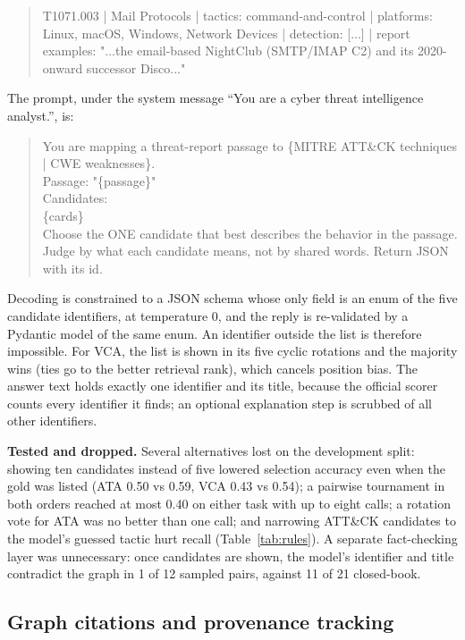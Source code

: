\documentclass[conference]{IEEEtran}
\begin{document}
\begin{quote}\footnotesize\ttfamily
T1071.003 | Mail Protocols | tactics: command-and-control | platforms: Linux, macOS, Windows, Network Devices | detection: [...] | report examples: "...the email-based NightClub (SMTP/IMAP C2) and its 2020-onward successor Disco..."
\end{quote}

The prompt, under the system message ``You are a cyber threat intelligence analyst.'', is:

\begin{quote}\footnotesize\ttfamily
You are mapping a threat-report passage to \{MITRE ATT\&CK techniques | CWE weaknesses\}.\\
Passage: "\{passage\}"\\
Candidates:\\
\{cards\}\\
Choose the ONE candidate that best describes the behavior in the passage. Judge by what each candidate means, not by shared words. Return JSON with its id.
\end{quote}

\noindent Decoding is constrained to a JSON schema whose only field is an enum of the five candidate identifiers, at temperature 0, and the reply is re-validated by a Pydantic model of the same enum. An identifier outside the list is therefore impossible. For VCA, the list is shown in its five cyclic rotations and the majority wins (ties go to the better retrieval rank), which cancels position bias. The answer text holds exactly one identifier and its title, because the official scorer counts every identifier it finds; an optional explanation step is scrubbed of all other identifiers.

\textbf{Tested and dropped.} Several alternatives lost on the development split: showing ten candidates instead of five lowered selection accuracy even when the gold was listed (ATA 0.50 vs 0.59, VCA 0.43 vs 0.54); a pairwise tournament in both orders reached at most 0.40 on either task with up to eight calls; a rotation vote for ATA was no better than one call; and narrowing ATT\&CK candidates to the model's guessed tactic hurt recall (Table~\ref{tab:rules}). A separate fact-checking layer was unnecessary: once candidates are shown, the model's identifier and title contradict the graph in 1 of 12 sampled pairs, against 11 of 21 closed-book.

\subsection{Graph citations and provenance tracking}
\end{document}
